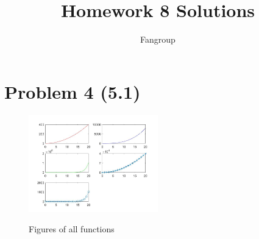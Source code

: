 \documentclass[12pt]{article}
\begin{document}
 
 
\title{Homework 8 Solutions}
\author{Fangroup}
\maketitle

\section*{Problem 4 (5.1)}

\begin{figure}[htbp]
  \caption{Figures of all functions}
  \centering
    \includegraphics[width=0.5\textwidth]{Fig1.jpg}
    \label{fig1}
\end{figure}
\end{document}
